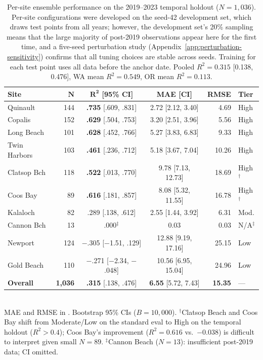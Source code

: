 \documentclass[toxins,article,submit,moreauthors]{Definitions/mdpi}
\begin{document}
\begin{table}[H]
\caption{Per-site ensemble performance on the 2019--2023 temporal holdout ($N = 1{,}036$). Per-site configurations were developed on the seed-42 development set, which draws test points from all years; however, the development set's 20\% sampling means that the large majority of post-2019 observations appear here for the first time, and a five-seed perturbation study (Appendix~\ref{app:perturbation-sensitivity}) confirms that all tuning choices are stable across seeds. Training for each test point uses all data before the anchor date. Pooled $R^2 = 0.315$ [0.138, 0.476], WA mean $R^2 = 0.549$, OR mean $R^2 = 0.113$.}
\label{tab:temporal-holdout}
\centering\scriptsize
\begin{tabular*}{\linewidth}{@{\extracolsep{\fill}}lrccrl}
\toprule
\textbf{Site} & $\boldsymbol{N}$ & $\boldsymbol{R^2}$ \textbf{[95\% CI]} & \textbf{MAE [CI]} & \textbf{RMSE} & \textbf{Tier} \\
\midrule
Quinault      & 144 & \textbf{.735} [.609, .831] & 2.72 [2.12, 3.40] & 4.69  & High \\
Copalis       & 152 & \textbf{.629} [.504, .753] & 3.20 [2.51, 3.96] & 5.56  & High \\
Long Beach    & 101 & \textbf{.628} [.452, .766] & 5.27 [3.83, 6.83] & 9.33  & High \\
Twin Harbors  & 103 & \textbf{.461} [.236, .712] & 5.18 [3.67, 7.04] & 10.26 & High \\
Clatsop Bch   & 118 & \textbf{.522} [.013, .770] & 9.78 [7.13, 12.73] & 18.69 & High$^\dagger$ \\
Coos Bay      &  89 & \textbf{.616} [.181, .857] & 8.08 [5.32, 11.55] & 16.78 & High$^\dagger$ \\
\addlinespace
Kalaloch      &  82 & .289 [.138, .612] & 2.55 [1.44, 3.92] & 6.31  & Mod. \\
Cannon Bch    &  13 & .000$^\ddagger$ & 0.03 & 0.03  & N/A$^\ddagger$ \\
Newport       & 124 & $-$.305 [$-$1.51, .129] & 12.88 [9.19, 17.16] & 25.15 & Low \\
Gold Beach    & 110 & $-$.271 [$-$2.34, $-$.048] & 10.56 [6.95, 15.04] & 24.96 & Low \\
\midrule
\textbf{Overall} & \textbf{1,036} & \textbf{.315} [.138, .476] & \textbf{6.55} [5.72, 7.43] & \textbf{15.35} & --- \\
\bottomrule
\end{tabular*}
\vspace{0.3em}\\
\footnotesize{MAE and RMSE in \si{\microgrampeg}. Bootstrap 95\% CIs ($B = 10{,}000$). $^\dagger$Clatsop Beach and Coos Bay shift from Moderate/Low on the standard eval to High on the temporal holdout ($R^2 > 0.4$); Coos Bay's improvement ($R^2 = 0.616$ vs.\ $-0.038$) is difficult to interpret given small $N = 89$. $^\ddagger$Cannon Beach ($N = 13$): insufficient post-2019 data; CI omitted.}
\end{table}
\end{document}
